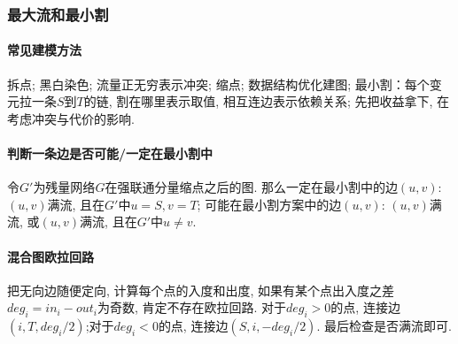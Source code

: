 \subsubsection{最大流和最小割}
	\paragraph{常见建模方法} 拆点; 黑白染色; 流量正无穷表示冲突; 缩点; 数据结构优化建图; 最小割：每个变元拉一条$S$到$T$的链, 割在哪里表示取值, 相互连边表示依赖关系; 先把收益拿下, 在考虑冲突与代价的影响. 
	\paragraph{判断一条边是否可能/一定在最小割中}令$G'$为残量网络$G$在强联通分量缩点之后的图. 那么一定在最小割中的边$(u,v)$: $(u,v)$满流, 且在$G'$中$u=S,v=T$; 可能在最小割方案中的边$(u,v)$: $(u,v)$满流, 或$(u,v)$满流, 且在$G'$中$u\neq v$. 
	\paragraph{混合图欧拉回路}把无向边随便定向, 计算每个点的入度和出度, 如果有某个点出入度之差$deg_i=in_i-out_i$为奇数, 肯定不存在欧拉回路. 对于$deg_i>0$的点, 连接边$(i,T,deg_i/2)$;对于$deg_i<0$的点, 连接边$(S,i,-deg_i/2)$. 最后检查是否满流即可. 
